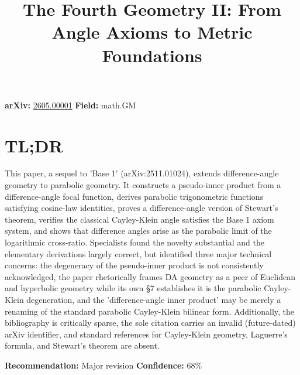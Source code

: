 \documentclass[11pt]{article}
\title{The Fourth Geometry II: From Angle Axioms to Metric Foundations}
\date{}
\begin{document}
\maketitle

\noindent\textbf{arXiv:} \href{https://arxiv.org/abs/2605.00001}{2605.00001} \quad \textbf{Field:} math.GM\\

\section*{TL;DR}
This paper, a sequel to 'Base 1' (arXiv:2511.01024), extends difference-angle geometry to parabolic geometry. It constructs a pseudo-inner product from a difference-angle focal function, derives parabolic trigonometric functions satisfying cosine-law identities, proves a difference-angle version of Stewart's theorem, verifies the classical Cayley-Klein angle satisfies the Base 1 axiom system, and shows that difference angles arise as the parabolic limit of the logarithmic cross-ratio. Specialists found the novelty substantial and the elementary derivations largely correct, but identified three major technical concerns: the degeneracy of the pseudo-inner product is not consistently acknowledged, the paper rhetorically frames DA geometry as a peer of Euclidean and hyperbolic geometry while its own §7 establishes it is the parabolic Cayley-Klein degeneration, and the 'difference-angle inner product' may be merely a renaming of the standard parabolic Cayley-Klein bilinear form. Additionally, the bibliography is critically sparse, the sole citation carries an invalid (future-dated) arXiv identifier, and standard references for Cayley-Klein geometry, Laguerre's formula, and Stewart's theorem are absent.

\textbf{Recommendation:} Major revision \quad \textbf{Confidence:} 68\%\\
\end{document}
